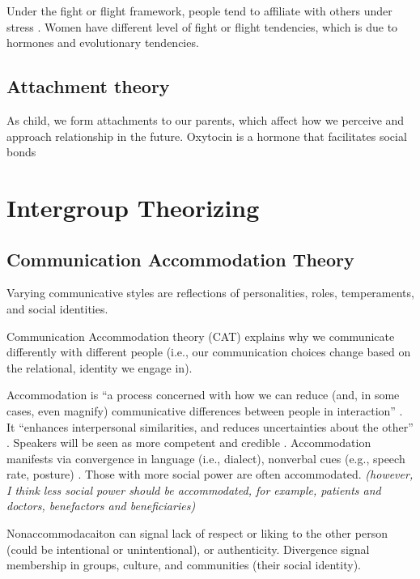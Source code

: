 \documentclass[
]{book}
\begin{document}
Under the fight or flight framework, people tend to affiliate with others under stress \citep{Taylor_2012}. Women have
different level of fight or flight tendencies, which is due to hormones and evolutionary tendencies.

\hypertarget{attachment-theory}{%
\subsection{Attachment theory}\label{attachment-theory}}

\citep{Bowlby_1982} As child, we form attachments to our parents, which affect how we perceive and approach relationship in
the future. Oxytocin is a hormone that facilitates social bonds \citep{Campbell_2010}

\hypertarget{intergroup-theorizing}{%
\section{Intergroup Theorizing}\label{intergroup-theorizing}}

\hypertarget{communication-accommodation-theory}{%
\subsection{Communication Accommodation Theory}\label{communication-accommodation-theory}}

Varying communicative styles are reflections of personalities, roles, temperaments, and social identities.

Communication Accommodation theory (CAT) explains why we communicate differently with different people (i.e., our
communication choices change based on the relational, identity we engage in).

Accommodation is ``a process concerned with how we can reduce (and, in some cases, even magnify) communicative
differences between people in interaction'' \citep[pp.~237]{Baxter_2008}. It ``enhances interpersonal similarities, and reduces
uncertainties about the other'' \citep[pp.~237]{Baxter_2008}. Speakers will be seen as more competent and credible
\citep{Aune_1993}. Accommodation manifests via convergence in language (i.e., dialect), nonverbal cues (e.g., speech rate,
posture) \citep{Li_2001}. Those with more social power are often accommodated. \emph{(however, I think less social power should be
accommodated, for example, patients and doctors, benefactors and beneficiaries)}

Nonaccommodacaiton can signal lack of respect or liking to the other person (could be intentional or unintentional), or
authenticity. Divergence signal membership in groups, culture, and communities (their social identity).
\end{document}
